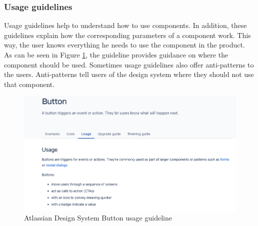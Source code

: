\subsubsection{Usage guidelines} Usage guidelines help to understand how to use components. In addition, these guidelines explain how the corresponding parameters of a component work. This way, the user knows everything he needs to use the component in the product. \cite{vesselov_building_2019} \\
As can be seen in Figure \ref{atlassian_button}, the guideline provides guidance on where the component should be used. Sometimes usage guidelines also offer anti-patterns to the users. Anti-patterns tell users of the design system where they should not use that component.
\begin{figure}[htb]
\centerline{\includegraphics[width=\linewidth]{images/atlassian_button_usage.png}}
\caption{Atlassian Design System Button usage guideline \cite{atlassian_design_system_atlassian_nodate}}
\label{atlassian_button}
\end{figure}

